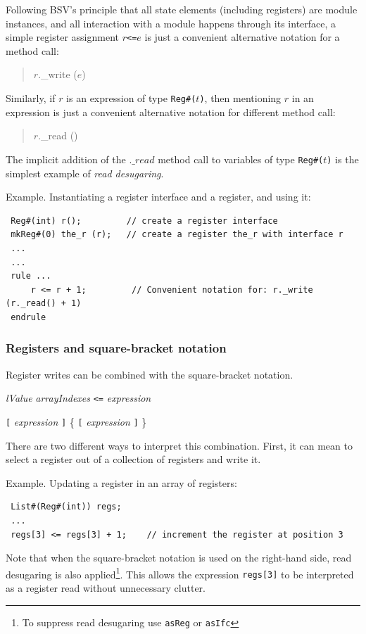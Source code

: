 \documentclass[twoside,letterpaper]{article}
\newcommand{\hm}{\hspace*{1em}}
\newcommand{\BSV}{BSV}
\newcommand{\nterm}[1]{\emph{#1}}
\newcommand{\term}[1]{\texttt{#1}}
\newcommand{\many}[1]{\{ #1 \}}
\newcommand{\gram}[2]{    \hm\makebox[10em][l]{\it #1}\makebox[1.5em][l]{::=}    #2}
\begin{document}
Following {\BSV}'s principle that all state elements (including
registers) are module instances, and all interaction with a module
happens through its interface, a simple register assignment 
\texttt{$r$<=$e$} is just a convenient alternative notation for 
a method call:
\begin{quote}
$r$.\_write ($e$)
\end{quote}

Similarly, if $r$ is an expression of type \texttt{Reg\#($t$)}, then
mentioning $r$ in an expression is just a convenient alternative
notation for different method call:
\begin{quote}
$r$.\_read ()
\end{quote}
The implicit addition of the $.\_read$ method call to variables of type
{\tt Reg\#($t$)} is the simplest example of \emph{read desugaring}.
 
Example. Instantiating a register interface and a register, and using it:
\begin{verbatim}
 Reg#(int) r();         // create a register interface
 mkReg#(0) the_r (r);   // create a register the_r with interface r
 ...
 ...
 rule ...
     r <= r + 1;         // Convenient notation for: r._write (r._read() + 1)
 endrule
\end{verbatim}

\subsubsection {Registers and square-bracket notation}
\label{sec-registers-and-brackets}

Register writes can be combined with the square-bracket notation.

\gram{regWrite}{ \nterm{lValue} \nterm{arrayIndexes} \term{<=} \nterm{expression} }

\gram{arrayIndexes}{ \term{[} \nterm{expression} \term{]}
                     \many{ \term{[} \nterm{expression} \term{]} } }


 There are two different ways to interpret this combination. First, it can 
 mean to select a register out of a collection of registers and write it.

Example. Updating a register in an array of registers:
\begin{verbatim}
 List#(Reg#(int)) regs;
 ...
 regs[3] <= regs[3] + 1;    // increment the register at position 3
\end{verbatim}
Note that when the square-bracket notation is used on the right-hand side, 
read desugaring is also applied\footnote{To suppress read desugaring
use {\tt asReg} or {\tt asIfc}}. This allows the expression {\tt regs[3]} to
be interpreted as a register read without unnecessary clutter. 
\end{document}
